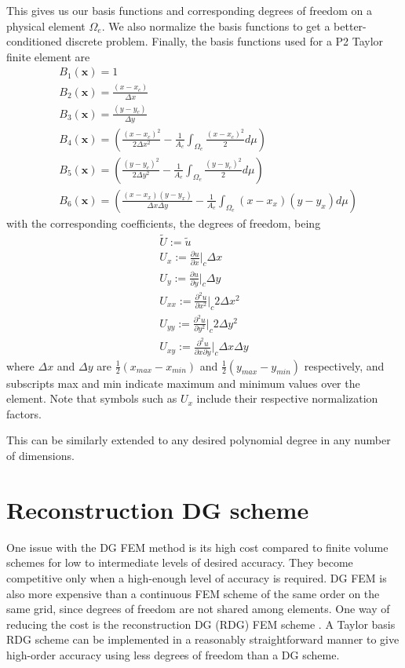 \documentclass[11pt]{article}
\let\bld\boldsymbol
\begin{document}
This gives us our basis functions and corresponding degrees of freedom on a physical element $\Omega_e$. We also normalize the basis functions to get a better-conditioned discrete problem. Finally, the basis functions used for a P2 Taylor finite element are
\begin{align}
&B_1(\bld{x}) = 1 \\
&B_2(\bld{x}) = \frac{(x-x_c)}{\Delta x} \\
&B_3(\bld{x}) = \frac{(y-y_c)}{\Delta y} \\
&B_4(\bld{x}) = \left( \frac{(x-x_c)^2}{2\Delta x^2} - \frac{1}{A_e}\int_{\Omega_e} \frac{(x-x_c)^2}{2}d\mu \right) \\
&B_5(\bld{x}) = \left( \frac{(y-y_c)^2}{2\Delta y^2} -\frac{1}{A_e}\int_{\Omega_e} \frac{(y-y_c)^2}{2}d\mu \right) \\
&B_6(\bld{x}) = \left( \frac{(x-x_x)(y-y_x)}{\Delta x\Delta y} - \frac{1}{A_e}\int_{\Omega_e} (x-x_x)(y-y_x)d\mu \right)
\end{align}
with the corresponding coefficients, the degrees of freedom, being
\begin{align}
\tilde{U} := \tilde{u} \\
U_x := \frac{\partial u}{\partial x}\Big|_c \Delta x \\
U_y := \frac{\partial u}{\partial y}\Big|_c \Delta y \\
U_{xx} := \frac{\partial^2 u}{\partial x^2}\Big|_c 2\Delta x^2 \\
U_{yy} := \frac{\partial^2 u}{\partial y^2}\Big|_c 2\Delta y^2 \\
U_{xy} := \frac{\partial^2 u}{\partial x\partial y}\Big|_c \Delta x\Delta y
\end{align}
where $\Delta x$ and $\Delta y$ are $\frac12 (x_{max}-x_{min})$ and $\frac12 (y_{max}-y_{min})$ respectively, and subscripts max and min indicate maximum and minimum values over the element. Note that symbols such as $U_x$ include their respective normalization factors.

This can be similarly extended to any desired polynomial degree in any number of dimensions.

\section{Reconstruction DG scheme}
One issue with the DG FEM method is its high cost compared to finite volume schemes for low to intermediate levels of desired accuracy. They become competitive only when a high-enough level of accuracy is required. DG FEM is also more expensive than a continuous FEM scheme of the same order on the same grid, since degrees of freedom are not shared among elements. One way of reducing the cost is the reconstruction DG (RDG) FEM scheme \cite{luo_rdg}. A Taylor basis RDG scheme can be implemented in a reasonably straightforward manner to give high-order accuracy using less degrees of freedom than a DG scheme.
\end{document}
